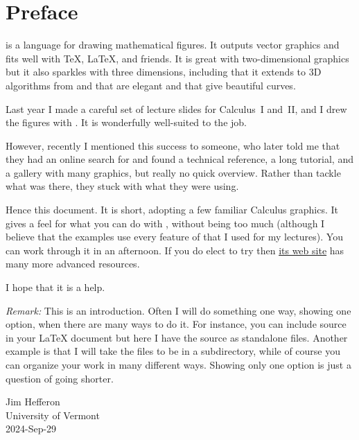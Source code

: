 \chapter*{Preface}
\Asy{} is a language for drawing mathematical figures. 
It outputs vector graphics and fits well with \TeX, \LaTeX{}, and friends.
It is great with two-dimensional graphics 
but it also sparkles with three dimensions,
including that it 
extends to 3D algorithms from \MF{} and \MP{} that are elegant and that
give beautiful curves. 

Last year I made a careful set of lecture slides for
Calculus~I and~II, and 
I drew the figures with \Asy.
It is wonderfully well-suited to the job.

However, recently I mentioned this success to someone, who later told
me that 
they had an online search for \Asy{} and found a technical reference, 
a long tutorial, and a gallery with many graphics, 
but really no quick overview.
Rather than tackle what was there, 
they stuck with what they were using.

Hence this document.
It is short, adopting a few familiar Calculus graphics.
It gives a feel for what you can do with \Asy, without being
too much 
(although I believe that the examples use every feature of 
\Asy{} that I used for my lectures).
You can work through it in an afternoon.
If you do elect to try \Asy{} then 
\href{https://asymptote.sourceforge.io/}{its web site} 
has many more advanced resources.

I hope that it is a help. 

\medskip\noindent
\textit{Remark:} This is an introduction.
Often I will do something one way, showing one option, when there
are many ways to do it.
For instance, you can include \Asy{} source in your \LaTeX{} document 
but here I have the source as standalone files.
Another example is that I will take the \Asy{} files to be in a 
 subdirectory,
while of course you can organize your work in many different ways.
Showing only one option is just a question of going shorter.

\medskip
\begin{flushleft}
Jim Hef{}feron  \\
University of Vermont \\
2024-Sep-29
\end{flushleft}